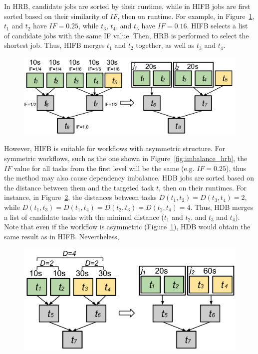 In HRB, candidate jobs are sorted by their runtime, while in HIFB jobs are first sorted based on their similarity of $IF$, then on runtime. For example, in Figure~\ref{fig:imbalance_hifb}, $t_1$ and $t_2$ have $IF = 0.25$, while $t_3$, $t_4$, and $t_5$ have $IF = 0.16$. HIFB selects a list of candidate jobs with the same IF value. Then, HRB is performed to select the shortest job. Thus, HIFB merges $t_1$ and $t_2$ together, as well as $t_3$ and $t_4$.

\begin{figure}[htb]
	\centering
	\includegraphics[width=\linewidth]{figures/imbalance/hifb.pdf}
	\label{fig:imbalance_hifb}
\end{figure}

However, HIFB is suitable for workflows with asymmetric structure. For symmetric workflows, such as the one shown in Figure~\ref{fig:imbalance_hrb}, the $IF$ value for all tasks from the first level will be the same (e.g. $IF=0.25$), thus the method may also cause dependency imbalance. HDB jobs are sorted based on the distance between them and the targeted task $t$, then on their runtimes. For instance, in Figure~\ref{fig:imbalance_hdb}, the distances between tasks $D(t_1,t_2)=D(t_3,t_4)=2$, while $D(t_1,t_3)=D(t_1,t_4)=D(t_2,t_3)=D(t_2,t_4)=4$. Thus, HDB merges a list of candidate tasks with the minimal distance ($t_1$ and $t_2$, and $t_3$ and $t_4$). Note that even if the workflow is asymmetric (Figure~\ref{fig:imbalance_hifb}), HDB would obtain the same result as in HIFB. 
Nevertheless, 

\begin{figure}[htb]
	\centering
	\includegraphics[width=0.85\linewidth]{figures/imbalance/hdb.pdf}
	\label{fig:imbalance_hdb}
\end{figure}

